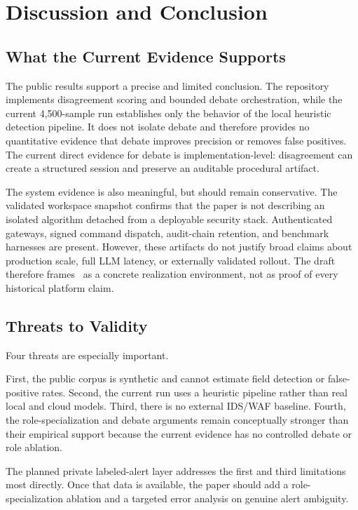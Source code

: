 \section{Discussion and Conclusion}\label{sec:discussion}

\subsection{What the Current Evidence Supports}

The public results support a precise and limited conclusion. The repository implements disagreement scoring and bounded debate orchestration, while the current 4,500-sample run establishes only the behavior of the local heuristic detection pipeline. It does not isolate debate and therefore provides no quantitative evidence that debate improves precision or removes false positives. The current direct evidence for debate is implementation-level: disagreement can create a structured session and preserve an auditable procedural artifact.

The system evidence is also meaningful, but should remain conservative. The validated workspace snapshot confirms that the paper is not describing an isolated algorithm detached from a deployable security stack. Authenticated gateways, signed command dispatch, audit-chain retention, and benchmark harnesses are present. However, these artifacts do not justify broad claims about production scale, full LLM latency, or externally validated rollout. The draft therefore frames \system\ as a concrete realization environment, not as proof of every historical platform claim.

\subsection{Threats to Validity}

Four threats are especially important.

First, the public corpus is synthetic and cannot estimate field detection or false-positive rates. Second, the current run uses a heuristic pipeline rather than real local and cloud models. Third, there is no external IDS/WAF baseline. Fourth, the role-specialization and debate arguments remain conceptually stronger than their empirical support because the current evidence has no controlled debate or role ablation.

The planned private labeled-alert layer addresses the first and third limitations most directly. Once that data is available, the paper should add a role-specialization ablation and a targeted error analysis on genuine alert ambiguity.

